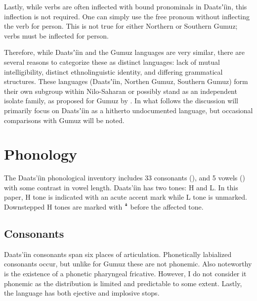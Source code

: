 \documentclass[output=paper]{langsci/langscibook}
\begin{document}
Lastly, while verbs are often inflected with bound pronominals in Daatsʼíin, this inflection is not required. One can simply use the free pronoun without inflecting the verb for person. This is not true for either Northern or Southern Gumuz; verbs must be inflected for person.

Therefore, while Daatsʼíin and the Gumuz languages are very similar, there are several reasons to categorize these as distinct languages: lack of mutual intelligibility, distinct ethnolinguistic identity, and differing grammatical structures. These languages (Daatsʼíin, Northen Gumuz, Southern Gumuz) form their own subgroup within Nilo-Saharan or possibly stand as an independent isolate family, as proposed for Gumuz by \citet{Dimmendaal2011}. In what follows the discussion will primarily focus on Daatsʼíin as a hitherto undocumented language, but occasional comparisons with Gumuz will be noted.


\section{Phonology}\label{sec:ahlandc:3}


The Daats’íin phonological inventory includes 33 consonants (), and 5 vowels () with some contrast in vowel length. Daats’íin has two tones: H and L. In this paper, H tone is indicated with an acute accent mark while L tone is unmarked. Downstepped H tones are marked with \textsf{ꜜ }before the affected tone.


\subsection{Consonants}\label{sec:ahlandc:3.1}

Daats’íin consonants span six places of articulation. Phonetically labialized consonants occur, but unlike for Gumuz these are not phonemic. Also noteworthy is the existence of a phonetic pharyngeal fricative. However, I do not consider it phonemic as the distribution is limited and predictable to some extent. Lastly, the language has both ejective and implosive stops.  
\end{document}
